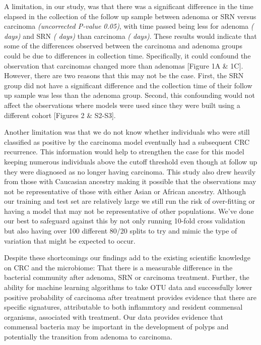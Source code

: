 \documentclass[12pt,]{article}
\begin{document}
A limitation, in our study, was that there was a significant difference
in the time elapsed in the collection of the follow up sample between
adenoma or SRN versus carcinoma \emph{(uncorrected P-value 0.05)}, with
time passed being less for adenoma \emph{( days)} and SRN \emph{( days)}
than carcinoma \emph{( days)}. These results would indicate that some of
the differences observed between the carcinoma and adenoma groups could
be due to differences in collection time. Specifically, it could
confound the observation that carcinomas changed more than adenomas
{[}Figure 1A \& 1C{]}. However, there are two reasons that this may not
be the case. First, the SRN group did not have a significant difference
and the collection time of their follow up sample was less than the
adenoma group. Second, this confounding would not affect the
observations where models were used since they were built using a
different cohort {[}Figures 2 \& S2-S3{]}.

Another limitation was that we do not know whether individuals who were
still classified as positive by the carcinoma model eventually had a
subsequent CRC recurrence. This information would help to strengthen the
case for this model keeping numerous individuals above the cutoff
threshold even though at follow up they were diagnosed as no longer
having carcinoma. This study also drew heavily from those with Caucasian
ancestry making it possible that the observations may not be
representative of those with either Asian or African ancestry. Although
our training and test set are relatively large we still run the risk of
over-fitting or having a model that may not be representative of other
populations. We've done our best to safeguard against this by not only
running 10-fold cross validation but also having over 100 different
80/20 splits to try and mimic the type of variation that might be
expected to occur.

Despite these shortcomings our findings add to the existing scientific
knowledge on CRC and the microbiome: That there is a measurable
difference in the bacterial community after adenoma, SRN or carcinoma
treatment. Further, the ability for machine learning algorithms to take
OTU data and successfully lower positive probability of carcinoma after
treatment provides evidence that there are specific signatures,
attributable to both inflammtory and resident commensal organisms,
associated with treatment. Our data provides evidence that commensal
bacteria may be important in the development of polyps and potentially
the transition from adenoma to carcinoma.
\end{document}
